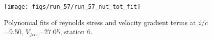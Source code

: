 \begin{figure}[H]
\centering
\texttt{[image: figs/run\_57/run\_57\_nut\_tot\_fit]}
\caption{Polynomial fits of reynolds stress and velocity gradient terms at $z/c$=9.50, $V_{free}$=27.05, station 6.}
\label{fig:run_57_nut_tot_fit}
\end{figure}



